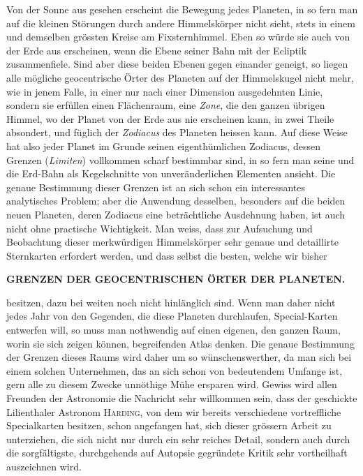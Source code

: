 Von der Sonne aus gesehen erscheint die Bewegung jedes Planeten, in so
fern man auf die kleinen Störungen durch andere Himmelskörper nicht sieht,
stets in einem und demselben grössten Kreise am Fixsternhimmel. Eben so
würde sie auch von der Erde aus erscheinen, wenn die Ebene seiner Bahn mit
der Ecliptik zusammenfiele. Sind aber diese beiden Ebenen gegen einander geneigt,
so liegen alle mögliche geocentrische Örter des Planeten auf der Himmelskugel
nicht mehr, wie in jenem Falle, in einer nur nach einer Dimension ausgedehnten
Linie, sondern sie erfüllen einen Flächenraum, eine \textit{Zone}, die den
ganzen übrigen Himmel, wo der Planet von der Erde aus nie erscheinen kann,
in zwei Theile absondert, und füglich der \textit{Zodiacus} des Planeten heissen kann.
Auf diese Weise hat also jeder Planet im Grunde seinen eigenthümlichen Zodiacus,
dessen Grenzen (\textit{Limiten}) vollkommen scharf bestimmbar sind, in so fern
man seine und die Erd-Bahn als Kegelschnitte von unveränderlichen Elementen
ansieht. Die genaue Bestimmung dieser Grenzen ist an sich schon ein interessantes
analytisches Problem; aber die Anwendung desselben, besonders auf die
beiden neuen Planeten, deren Zodiacus eine beträchtliche Ausdehnung haben,
ist auch nicht ohne practische Wichtigkeit. Man weiss, dass zur Aufsuchung
und Beobachtung dieser merkwürdigen Himmelskörper sehr genaue und detaillirte
Sternkarten erfordert werden, und dass selbst die besten, welche wir bisher
\par\clearpage
\endgroup
\begingroup
\pagestyle{empty}
\newcommand{\GaussVIGathering}[2]{%
  \fancypagestyle{gaussVIGathering}{%
    \fancyhf{}%
    \renewcommand{\headrulewidth}{0pt}%
    \renewcommand{\footrulewidth}{0pt}%
    \fancyfoot[C]{\makebox[\textwidth][l]{%
      \hspace*{.025\textwidth}{\footnotesize\bfseries #1}\hfill
      {\normalsize\bfseries #2}\hspace*{.18\textwidth}}}%
  }%
  \thispagestyle{gaussVIGathering}%
}
\noindent{}%
\makebox[12mm][l]{}%
\parbox[t]{\dimexpr\linewidth-24mm\relax}{\centering\fontsize{7.4}{9.2}\selectfont\bfseries GRENZEN DER GEOCENTRISCHEN ÖRTER DER PLANETEN.\par}%
\par\nobreak\smallskip
\noindent besitzen, dazu bei weiten noch nicht hinlänglich sind. Wenn man daher nicht
jedes Jahr von den Gegenden, die diese Planeten durchlaufen, Special-Karten
entwerfen will, so muss man nothwendig auf einen eigenen, den ganzen Raum,
worin sie sich zeigen können, begreifenden Atlas denken. Die genaue Bestimmung
der Grenzen dieses Raums wird daher um so wünschenswerther, da man
sich bei einem solchen Unternehmen, das an sich schon von bedeutendem Umfange
ist, gern alle zu diesem Zwecke unnöthige Mühe ersparen wird. Gewiss
wird allen Freunden der Astronomie die Nachricht sehr willkommen sein, dass
der geschickte Lilienthaler Astronom \textsc{Harding}, von dem wir bereits verschiedene
vortreffliche Specialkarten besitzen, schon angefangen hat, sich dieser
grössern Arbeit zu unterziehen, die sich nicht nur durch ein sehr reiches Detail,
sondern auch durch die sorgfältigste, durchgehends auf Autopsie gegründete Kritik
sehr vortheilhaft auszeichnen wird.

